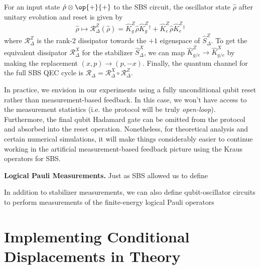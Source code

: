 For an input state $\hat{\rho}\otimes \op{+}{+}$ to the SBS circuit, the oscillator state $\hat{\rho}$ after unitary evolution and reset is given by
\begin{equation}
    \hat{\rho} \mapsto \mathcal{R}_\Delta^Z(\hat{\rho}) = \hat{K}_g^Z \hat{\rho} \hat{K}_g^Z{}^\dagger + \hat{K}_e^Z \hat{\rho} \hat{K}_e^Z{}^\dagger  
\end{equation}
where $\mathcal{R}_\Delta^Z$ is the rank-2 dissipator towards the $+1$ eigenspace of $\hat{S}_\Delta^Z$. To get the equivalent dissipator $\mathcal{R}_\Delta^X$ for the stabilizer $\hat{S}_\Delta^X$, we can map $\hat{K}_{g/e}^Z \to \hat{K}_{g/e}^X$ by making the replacement $(x, p) \to (p, -x)$. Finally, the quantum channel for the full SBS QEC cycle is $\mathcal{R}_\Delta = \mathcal{R}_\Delta^X \circ \mathcal{R}_\Delta^Z$. 

In practice, we envision in our experiments using a fully unconditional qubit reset rather than measurement-based feedback. In this case, we won't have access to the measurement statistics (i.e. the protocol will be truly \textit{open-loop}). Furthermore, the final qubit Hadamard gate can be omitted from the protocol and absorbed into the reset operation. Nonetheless, for theoretical analysis and certain numerical simulations, it will make things considerably easier to continue working in the artificial measurement-based feedback picture using the Kraus operators for SBS.

\noindent\textbf{Logical Pauli Measurements.} Just as SBS allowed us to define 

In addition to stabilizer measurements, we can also define qubit-oscillator circuits to perform measurements of the finite-energy logical Pauli operators 



\section{Implementing Conditional Displacements in Theory}

